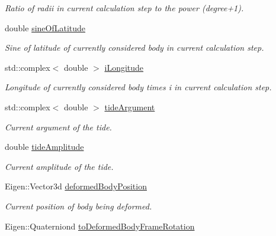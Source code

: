 \begin{DoxyCompactItemize}
\begin{DoxyCompactList}\small\item\em Ratio of radii in current calculation step to the power (degree+1). \end{DoxyCompactList}\item 
double \hyperlink{classtudat_1_1gravitation_1_1BasicSolidBodyTideGravityFieldVariations_adf49e1f8b787b2d8f3df4a8f9ba07d19}{sine\+Of\+Latitude}
\begin{DoxyCompactList}\small\item\em Sine of latitude of currently considered body in current calculation step. \end{DoxyCompactList}\item 
std\+::complex$<$ double $>$ \hyperlink{classtudat_1_1gravitation_1_1BasicSolidBodyTideGravityFieldVariations_aaf20605f78a1e71fff58a82e047b721d}{i\+Longitude}
\begin{DoxyCompactList}\small\item\em Longitude of currently considered body times i in current calculation step. \end{DoxyCompactList}\item 
std\+::complex$<$ double $>$ \hyperlink{classtudat_1_1gravitation_1_1BasicSolidBodyTideGravityFieldVariations_aace888d4e6e5dde87704145b40913294}{tide\+Argument}
\begin{DoxyCompactList}\small\item\em Current argument of the tide. \end{DoxyCompactList}\item 
double \hyperlink{classtudat_1_1gravitation_1_1BasicSolidBodyTideGravityFieldVariations_a6b196974e5ec21765cbf3d0c6054be11}{tide\+Amplitude}
\begin{DoxyCompactList}\small\item\em Current amplitude of the tide. \end{DoxyCompactList}\item 
Eigen\+::\+Vector3d \hyperlink{classtudat_1_1gravitation_1_1BasicSolidBodyTideGravityFieldVariations_ae4df43a455c3c408c467e55de0c2684b}{deformed\+Body\+Position}\hypertarget{classtudat_1_1gravitation_1_1BasicSolidBodyTideGravityFieldVariations_ae4df43a455c3c408c467e55de0c2684b}{}\label{classtudat_1_1gravitation_1_1BasicSolidBodyTideGravityFieldVariations_ae4df43a455c3c408c467e55de0c2684b}

\begin{DoxyCompactList}\small\item\em Current position of body being deformed. \end{DoxyCompactList}\item 
Eigen\+::\+Quaterniond \hyperlink{classtudat_1_1gravitation_1_1BasicSolidBodyTideGravityFieldVariations_aa3d565d7ddcb5e355b934d6e25b8ed55}{to\+Deformed\+Body\+Frame\+Rotation}\hypertarget{classtudat_1_1gravitation_1_1BasicSolidBodyTideGravityFieldVariations_aa3d565d7ddcb5e355b934d6e25b8ed55}{}\label{classtudat_1_1gravitation_1_1BasicSolidBodyTideGravityFieldVariations_aa3d565d7ddcb5e355b934d6e25b8ed55}


\end{DoxyCompactItemize}
